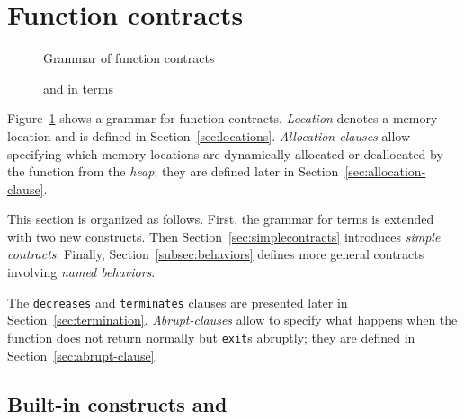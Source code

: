 \section{Function contracts}
\label{sec:fn-behavior}

\begin{figure}[t]
  \begin{cadre}
      
   \end{cadre}
    \caption{Grammar of function contracts}
  \label{fig:gram:contracts}
\end{figure}

\begin{figure}[t]
  \begin{cadre}
      
    \end{cadre}
    \caption{\protect\old and \protect\result in terms}
  \label{fig:gram:oldandresult}
\end{figure}

Figure~\ref{fig:gram:contracts} shows a grammar for function
contracts. \textsl{Location} denotes a memory location and is defined
in Section~\ref{sec:locations}. 
\textsl{Allocation-clauses} allow specifying which memory locations 
are dynamically allocated or deallocated by the function from the \textsl{heap}; 
they are defined later in Section~\ref{sec:allocation-clause}.

This section is organized as follows.  First, the grammar for terms is
extended with two new constructs.  Then
Section~\ref{sec:simplecontracts} introduces \emph{simple contracts}.
Finally, Section~\ref{subsec:behaviors} defines more general contracts
involving \emph{named behaviors}. 

The \lstinline|decreases| and
\lstinline|terminates| clauses are presented later in
Section~\ref{sec:termination}.
\textsl{Abrupt-clauses}
allow to specify what happens when the function does not return
normally but \lstinline|exit|s abruptly; they are defined in
Section~\ref{sec:abrupt-clause}.


\subsection{Built-in constructs %
  \texorpdfstring{\old}{\textbackslash{}old} %
 and \texorpdfstring{\result}{\textbackslash{}result}}

